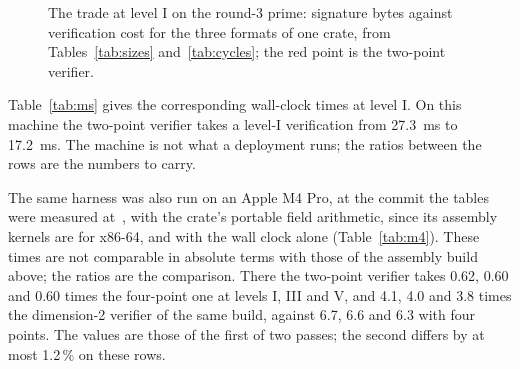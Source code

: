 \documentclass[version=preprint]{iacrcc}
\begin{document}
    \begin{figure}[t]
        \centering
        \caption{The trade at level I on the round-3 prime: signature bytes
            against verification cost for the three formats of one crate, from
            Tables~\ref{tab:sizes} and~\ref{tab:cycles}; the red point is the
            two-point verifier.}
        \label{fig:trade}
    \end{figure}

    Table~\ref{tab:ms} gives the corresponding wall-clock times at level I.
    On this machine the two-point verifier takes a level-I verification from
    27.3~ms to 17.2~ms.
    The machine is not what a deployment runs; the ratios between the rows are
    the numbers to carry.

    The same harness was also run on an Apple M4 Pro, at the commit the
    tables were measured at~\cite{Ray26c}, with the crate's portable field
    arithmetic, since its assembly kernels are for x86-64, and with the wall
    clock alone (Table~\ref{tab:m4}). These times are not comparable in
    absolute terms with those of the assembly build above; the ratios are the
    comparison. There the two-point verifier takes 0.62, 0.60 and 0.60 times
    the four-point one at levels I, III and V, and 4.1, 4.0 and 3.8 times the
    dimension-2 verifier of the same build, against 6.7, 6.6 and 6.3 with
    four points. The values are those of the first of two passes; the second
    differs by at most 1.2\,\% on these rows.
\end{document}
